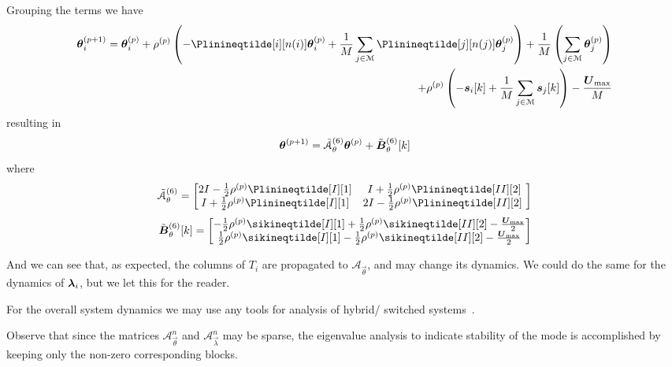 \documentclass[../main.tex]{subfiles}
\begin{document}
Grouping the terms we have
\begin{align}
  \thetai\pplusone=\thetai\p+\rho\p\left(-\Plinineqtilde[i][n(i)]\thetai\p+\frac{1}{M}\sum_{j\in\set{M}}\Plinineqtilde[j][n(j)]\vec{\theta}_{j}\p\right)+\frac{1}{M}\left(\sum_{j\in\set{M}}\vec{\theta}_{j}\p\right)\\+\rho\p\left(-\sik+\frac{1}{M}\sum_{j\in\set{M}}\vec{s}_{j}[k]\right) -\frac{\vec{U}_{\max}}{M}
\end{align}
resulting in
\begin{equation}
  \boldsymbol{\theta}^{(p+1)}=\tilde{\mathcal{A}}_{\theta}^{(6)}\boldsymbol{\theta}^{(p)}+\tilde{\mathcal{\boldsymbol{B}}}_{\theta}^{(6)}[k]
\end{equation}
where
\begin{equation}
  \tilde{\mathcal{A}}_{\theta}^{(6)}=\left[
    \begin{matrix}
      2I-\frac{1}{2}\rho\p \Plinineqtilde[I][1] & I+\frac{1}{2}\rho\p \Plinineqtilde[II][2]\\
      I+\frac{1}{2}\rho\p \Plinineqtilde[I][1] & 2I-\frac{1}{2}\rho\p \Plinineqtilde[II][2]\
    \end{matrix}
  \right]
\end{equation}
\begin{equation}
  \tilde{\mathcal{\vec{B}}}_{\theta}^{(6)}[k]=\left[
    \begin{matrix}
      -\frac{1}{2}\rho\p \sikineqtilde[I][1]+\frac{1}{2}\rho\p \sikineqtilde[II][2]-\frac{\vec{U}_{\max}}{2}\\
      \frac{1}{2}\rho\p \sikineqtilde[I][1]-\frac{1}{2}\rho\p \sikineqtilde[II][2]-\frac{\vec{U}_{\max}}{2}
    \end{matrix}
  \right]
\end{equation}

And we can see that, as expected, the columns of $T_{i}$ are propagated to $\mathcal{A}_{\vec{\theta}}$, and may change its dynamics.
We could do the same for the dynamics of $\boldsymbol{\lambda}_i$, but we let this for the reader.

For the overall system dynamics we may use any tools for analysis of hybrid/ switched systems~\cite{BorrelliEtAl2017}.

\begin{remark}
  Observe that since the matrices $\mathcal{A}_{\vec{\theta}}^{n}$ and $\mathcal{A}_{\vec{\lambda}}^{n}$ may be sparse, the eigenvalue analysis to indicate stability of the mode is accomplished by keeping only the non-zero corresponding blocks.
\end{remark}
\end{document}
